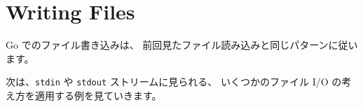 \section{Writing Files}

Go でのファイル書き込みは、 前回見たファイル読み込みと同じパターンに従います。




次は、\texttt{stdin} や \texttt{stdout} ストリームに見られる、 いくつかのファイル I/O の考え方を適用する例を見ていきます。